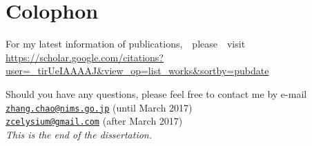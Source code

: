 \chapter*{Colophon}


\begin{center}

For my latest information of publications,　please　visit \\\url{https://scholar.google.com/citations?user=_tirUeIAAAAJ&view_op=list_works&sortby=pubdate}

Should you have any questions, please feel free to contact me by e-mail
\\\href{mailto:zhang.chao@nims.go.jp}{\nolinkurl{zhang.chao@nims.go.jp}} (until March 2017)
\\\href{mailto:zcelysium@gmail.com}{\nolinkurl{zcelysium@gmail.com}} (after March 2017)
\\[10ex]\emph{This is the end of the dissertation. } 

\end{center}